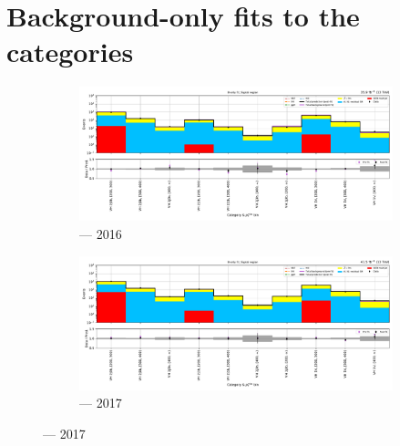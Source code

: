 \clearpage




\section{Background-only fits to the \texorpdfstring{\VH}{VH} categories}
\label{sec:B_only_fit_plots_VH_SR}

\begin{figure}[htbp]
    \centering
    \begin{subfigure}[b]{0.9\textwidth}
        \includegraphics[width=\textwidth]{chapters/higgstoinv/figures/mountain_ranges/2016/VH/SR_tree_fit_b-abs_values_VH_cats.pdf}
        \caption{\VH --- 2016}
    \end{subfigure}

    \begin{subfigure}[b]{0.9\textwidth}
        \includegraphics[width=\textwidth]{chapters/higgstoinv/figures/mountain_ranges/2017/VH/SR_tree_fit_b-abs_values_VH_cats.pdf}
        \caption{\VH --- 2017}
    \end{subfigure}


\end{figure}

